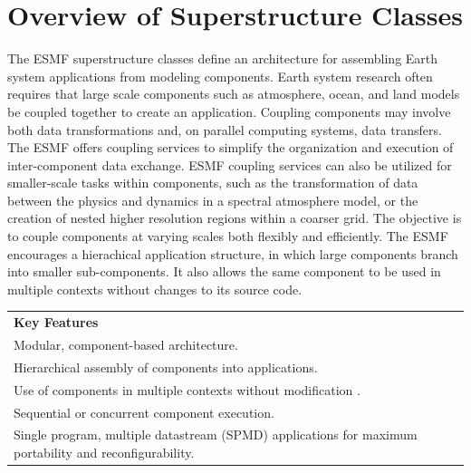 %

\section{Overview of Superstructure Classes}

The ESMF superstructure classes define an architecture for assembling
Earth system applications from modeling components.  Earth system research 
often requires that large scale components such as atmosphere, ocean,
and land models be coupled together to create an application.  
Coupling components may involve both data transformations and, on 
parallel computing systems, data transfers.  The ESMF offers coupling 
services to simplify the organization and execution of inter-component 
data exchange.  ESMF coupling services can also be utilized for 
smaller-scale tasks within components, such as the 
transformation of data between the physics and dynamics in a spectral 
atmosphere model, or the creation of nested higher resolution regions 
within a coarser grid.  The objective is to couple components at varying 
scales both flexibly and efficiently.  The ESMF encourages a hierachical
application structure, in which large components branch into 
smaller sub-components.  It also allows the same component to be 
used in multiple contexts without changes to its source code.

\begin{center}  
\begin{tabular}{|p{6in}|}
\hline
\vspace{.01in}
{\bf Key Features} \\[.01in]
Modular, component-based architecture. \\
Hierarchical assembly of components into applications.\\
Use of components in multiple contexts without modification .\\
Sequential or concurrent component execution.\\
Single program, multiple datastream (SPMD) applications for 
maximum portability and reconfigurability.\\[.03in] \hline
\end{tabular}
\end{center}

